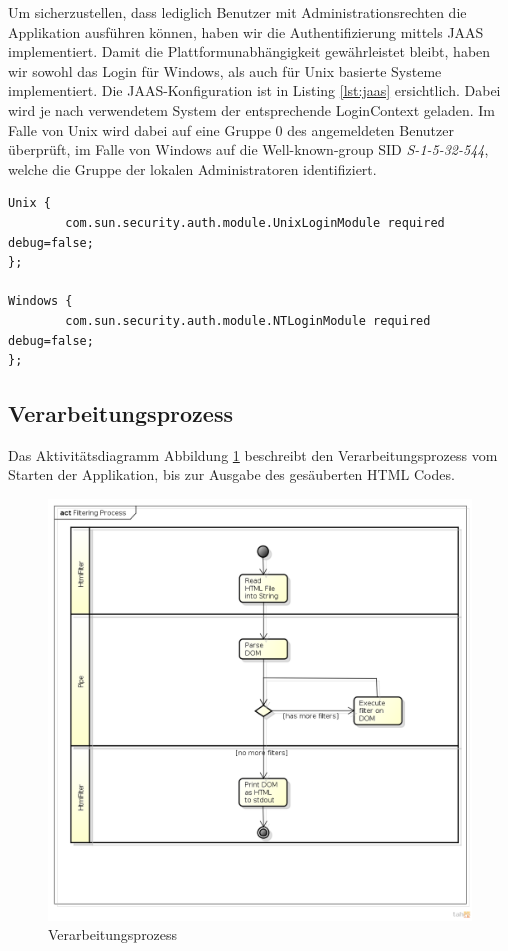 Um sicherzustellen, dass lediglich Benutzer mit Administrationsrechten die Applikation ausführen können,
haben wir die Authentifizierung mittels JAAS implementiert. Damit die Plattformunabhängigkeit 
gewährleistet bleibt, haben wir sowohl das Login für Windows, als auch für Unix basierte Systeme 
implementiert. Die JAAS-Konfiguration ist in Listing \ref{lst:jaas} ersichtlich. Dabei wird je
nach verwendetem System der entsprechende LoginContext geladen. Im Falle von Unix wird dabei auf eine
Gruppe 0 des angemeldeten Benutzer überprüft, im Falle von Windows auf die Well-known-group 
SID\cite{MS:SID} \textit{S-1-5-32-544}, welche die Gruppe der lokalen Administratoren identifiziert. 
\newline
\begin{lstlisting}[caption="JAAS konfiguration im File jaas\_security.conf", label={lst:jaas}]
Unix {
        com.sun.security.auth.module.UnixLoginModule required debug=false;
};

Windows {
        com.sun.security.auth.module.NTLoginModule required debug=false;
};
\end{lstlisting}

\newpage

\subsection{Verarbeitungsprozess}

Das Aktivitätsdiagramm Abbildung \ref{fig:process} beschreibt den Verarbeitungsprozess vom Starten der Applikation, bis zur Ausgabe des gesäuberten HTML Codes.

\begin{figure}[H]
	\begin{center}
		\includegraphics[width=1.0\textwidth]{./content/Filtering_Process_cut.png}
	\end{center}
	\caption{Verarbeitungsprozess}
	\label{fig:process}
\end{figure}

